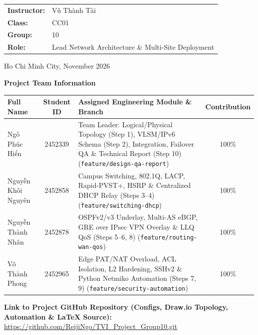 \begin{titlepage}
    \vspace{2.2cm}

    \begin{minipage}{0.78\textwidth}
        \large
        \begin{tabular}{ll}
            \textbf{Instructor:} & Vũ Thành Tài \\[0.2cm]
            \textbf{Class:}      & CC01 \\[0.2cm]
            \textbf{Group:}      & 10 \\[0.2cm]
            \textbf{Role:}       & Lead Network Architecture \& Multi-Site Deployment
        \end{tabular}
    \end{minipage}

    \vfill
    {\large Ho Chi Minh City, November 2026}
    \vspace*{0.6cm}
\end{titlepage}

\thispagestyle{empty}
\begin{center}
    \vspace{0.6cm}

    {\LARGE \textbf{Project Team Information}}
    \vspace{0.6cm}

    \begin{tabularx}{0.95\textwidth}{|l|c|X|c|}
        \hline
        \textbf{Full Name} & \textbf{Student ID} & \textbf{Assigned Engineering Module \& Branch} & \textbf{Contribution} \\
        \hline
        Ngô Phúc Hiển & 2452339 & Team Leader: Logical/Physical Topology (Step 1), VLSM/IPv6 Schema (Step 2), Integration, Failover QA \& Technical Report (Step 10) (\texttt{feature/design-qa-report}) & 100\% \\
        \hline
        Nguyễn Khôi Nguyên & 2452858 & Campus Switching, 802.1Q, LACP, Rapid-PVST+, HSRP \& Centralized DHCP Relay (Steps 3--4) (\texttt{feature/switching-dhcp}) & 100\% \\
        \hline
        Nguyễn Thành Nhân & 2452878 & OSPFv2/v3 Underlay, Multi-AS eBGP, GRE over IPsec VPN Overlay \& LLQ QoS (Steps 5--6, 8) (\texttt{feature/routing-wan-qos}) & 100\% \\
        \hline
        Võ Thành Phong & 2452965 & Edge PAT/NAT Overload, ACL Isolation, L2 Hardening, SSHv2 \& Python Netmiko Automation (Steps 7, 9) (\texttt{feature/security-automation}) & 100\% \\
        \hline
    \end{tabularx}

    \vspace{1.2cm}
    \textbf{Link to Project GitHub Repository (Configs, Draw.io Topology, Automation \& LaTeX Source):}\\
    \vspace{0.15cm}
    \url{https://github.com/ReijiNgo/TVI_Project_Group10.git}
\end{center}
\clearpage

